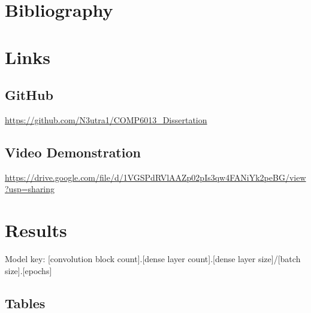 \documentclass[12pt]{article}
\begin{document}
\pagebreak
\section{Bibliography}


\pagebreak

\appendix

\section{Links}

\subsection{GitHub}

\url{https://github.com/N3utra1/COMP6013_Dissertation}

\subsection{Video Demonstration}

\url{https://drive.google.com/file/d/1VGSPdRVlAAZp02pIs3qw4FANiYk2peBG/view?usp=sharing}


\section{Results}


Model key: [convolution block count].[dense layer count].[dense layer size]/[batch size].[epochs]


\subsection{Tables}
\end{document}
